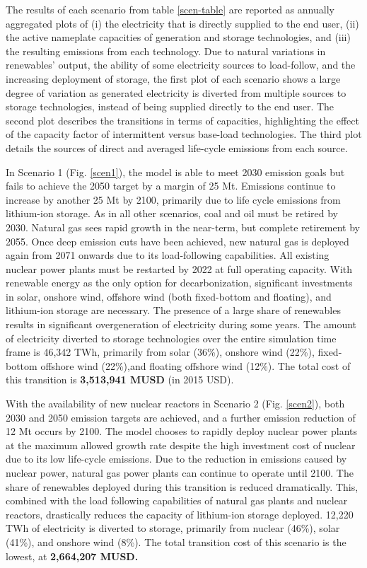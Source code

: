 The results of each scenario from table \ref{scen-table} are reported as annually aggregated plots of (i) the electricity that is directly supplied to the end user, (ii) the active nameplate capacities of generation and storage technologies, and (iii) the resulting emissions from each technology. Due to natural variations in renewables' output, the ability of some electricity sources to load-follow, and the increasing deployment of storage, the first plot of each scenario shows a large degree of variation as generated electricity is diverted from multiple sources to storage technologies, instead of being supplied directly to the end user. The second plot describes the transitions in terms of capacities, highlighting the effect of the capacity factor of intermittent versus base-load technologies. The third plot details the sources of direct and averaged life-cycle emissions from each source.

In Scenario 1 (Fig. \ref{scen1}), the model is able to meet 2030 emission goals but fails to achieve the 2050 target by a margin of 25 Mt. Emissions continue to increase by another 25 Mt by 2100, primarily due to life cycle emissions from lithium-ion storage. As in all other scenarios, coal and oil must be retired by 2030. Natural gas sees rapid growth in the near-term, but complete retirement by 2055. Once deep emission cuts have been achieved, new natural gas is deployed again from 2071 onwards due to its load-following capabilities. All existing nuclear power plants must be restarted by 2022 at full operating capacity. With renewable energy as the only option for decarbonization, significant investments in solar, onshore wind, offshore wind (both fixed-bottom and floating), and lithium-ion storage are necessary. The presence of a large share of renewables results in significant overgeneration of electricity during some years. The amount of electricity diverted to storage technologies over the entire simulation time frame is 46,342 TWh, primarily from solar (36\%), onshore wind (22\%), fixed-bottom offshore wind (22\%),and floating offshore wind (12\%). The total cost of this transition is \textbf{3,513,941 MUSD} (in 2015 USD).


With the availability of new nuclear reactors in Scenario 2 (Fig. \ref{scen2}), both 2030 and 2050 emission targets are achieved, and a further emission reduction of 12 Mt occurs by 2100. The model chooses to rapidly deploy nuclear power plants at the maximum allowed growth rate despite the high investment cost of nuclear due to its low life-cycle emissions. Due to the reduction in emissions caused by nuclear power, natural gas power plants can continue to operate until 2100. The share of renewables deployed during this transition is reduced dramatically. This, combined with the load following capabilities of natural gas plants and nuclear reactors, drastically reduces the capacity of lithium-ion storage deployed. 12,220 TWh of electricity is diverted to storage, primarily from nuclear (46\%), solar (41\%), and onshore wind (8\%). The total transition cost of this scenario is the lowest, at \textbf{2,664,207 MUSD.}

